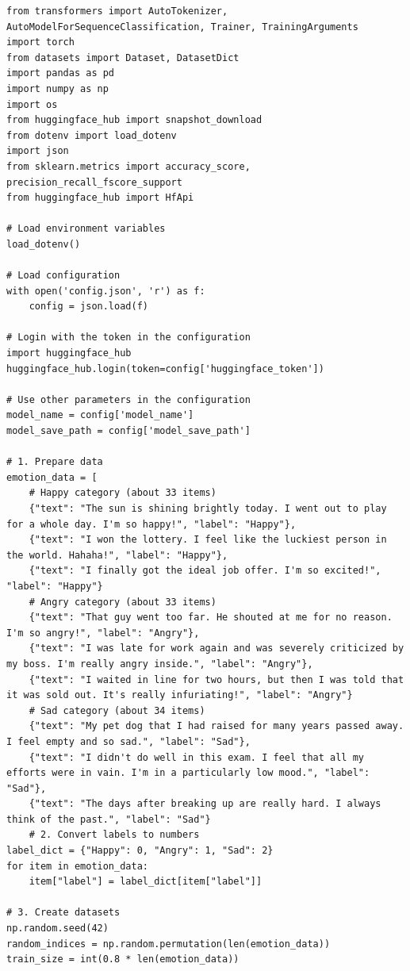 \documentclass[journal]{IEEEtran}
\begin{document}
\begin{verbatim}
from transformers import AutoTokenizer, AutoModelForSequenceClassification, Trainer, TrainingArguments
import torch
from datasets import Dataset, DatasetDict
import pandas as pd
import numpy as np
import os
from huggingface_hub import snapshot_download
from dotenv import load_dotenv
import json
from sklearn.metrics import accuracy_score, precision_recall_fscore_support
from huggingface_hub import HfApi

# Load environment variables
load_dotenv()

# Load configuration
with open('config.json', 'r') as f:
    config = json.load(f)

# Login with the token in the configuration
import huggingface_hub
huggingface_hub.login(token=config['huggingface_token'])

# Use other parameters in the configuration
model_name = config['model_name']
model_save_path = config['model_save_path']

# 1. Prepare data
emotion_data = [
    # Happy category (about 33 items)
    {"text": "The sun is shining brightly today. I went out to play for a whole day. I'm so happy!", "label": "Happy"},
    {"text": "I won the lottery. I feel like the luckiest person in the world. Hahaha!", "label": "Happy"},
    {"text": "I finally got the ideal job offer. I'm so excited!", "label": "Happy"}
    # Angry category (about 33 items)
    {"text": "That guy went too far. He shouted at me for no reason. I'm so angry!", "label": "Angry"},
    {"text": "I was late for work again and was severely criticized by my boss. I'm really angry inside.", "label": "Angry"},
    {"text": "I waited in line for two hours, but then I was told that it was sold out. It's really infuriating!", "label": "Angry"}
    # Sad category (about 34 items)
    {"text": "My pet dog that I had raised for many years passed away. I feel empty and so sad.", "label": "Sad"},
    {"text": "I didn't do well in this exam. I feel that all my efforts were in vain. I'm in a particularly low mood.", "label": "Sad"},
    {"text": "The days after breaking up are really hard. I always think of the past.", "label": "Sad"}
    # 2. Convert labels to numbers
label_dict = {"Happy": 0, "Angry": 1, "Sad": 2}
for item in emotion_data:
    item["label"] = label_dict[item["label"]]

# 3. Create datasets
np.random.seed(42)
random_indices = np.random.permutation(len(emotion_data))
train_size = int(0.8 * len(emotion_data))


\end{verbatim}
\end{document}
